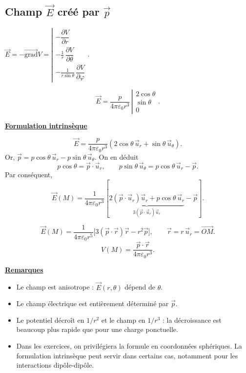 \documentclass[11pt,a4paper]{article}
\newif\ifinexample
\newcommand{\dd}{\mathrm d}
\newcommand{\grad}{\overrightarrow{\mathrm{grad}}}
\newcommand{\titr}[1]{\par\ifinexample\else\Needspace{4\baselineskip}\fi\textbf{\underline{#1}}\par\nopagebreak[3]}
\newcommand{\stars}[1]{\mathord{\star}\ifnum#1>1\mkern5mu\mathord{\star}\fi\ifnum#1>2\mkern5mu\mathord{\star}\fi\ifnum#1>3\mkern5mu\mathord{\star}\fi\ifnum#1>4\mkern5mu\mathord{\star}\fi\ifnum#1>5\mkern5mu\mathord{\star}\fi}
\newenvironment{result}[1][4]{\begin{cadre}[etoiles={\stars{#1}}]}{\end{cadre}}
\newcommand{\ur}{\vec u_r}\newcommand{\ut}{\vec u_\theta}\newcommand{\uphi}{\vec u_\varphi}
\newcommand{\eps}{\varepsilon_0}\newcommand{\E}{\vec E}\newcommand{\dS}{\dd\vec S}\newcommand{\dM}{\dd\vec M}
\newcommand{\mom}{\vec p}
\newcommand{\fle}[1]{\overrightarrow{#1}}
\newcommand{\trois}[3]{\left|\begin{matrix}#1\\#2\\#3\end{matrix}\right.}
\newcommand{\surdeux}[3]{\par\noindent
  \begin{minipage}[c]{#1\linewidth}\centering #2\end{minipage}\hfill
  \begin{minipage}[c]{\dimexpr\linewidth-#1\linewidth-5mm\relax}#3\end{minipage}\par}
\newcommand{\betoile}[2]{\begin{result}[#1]\[#2\]\end{result}}
\begin{document}
\subsection{Champ \texorpdfstring{\(\E\)}{E} créé par \texorpdfstring{\(\mom\)}{p}}\label{sec:champ}
\surdeux{.37}{\(\displaystyle
 \E=-\grad V=\left|\begin{matrix}
 -\dfrac{\partial V}{\partial r}\\[4pt]
 -\tfrac1r\,\dfrac{\partial V}{\partial\theta}\\[4pt]
 -\tfrac1{r\sin\theta}\,\dfrac{\partial V}{\partial\varphi}
 \end{matrix}\right..\)}{
\betoile{4}{\E=\frac{p}{4\pi\eps r^3}\,\trois{2\cos\theta}{\sin\theta}{0}.}}
\titr{Formulation intrinsèque}
\[
 \E=\frac{p}{4\pi\eps r^3}\left(2\cos\theta\,\ur+\sin\theta\,\ut\right).
\]
Or, \(\mom=p\cos\theta\,\ur-p\sin\theta\,\ut\). On en déduit
\[
 p\cos\theta=\mom\cdot\ur,\qquad
 p\sin\theta\,\ut=p\cos\theta\,\ur-\mom.
\]
Par conséquent,
\[
 \E(M)=\frac1{4\pi\eps r^3}\left[
 \underbrace{2(\mom\cdot\ur)\ur+p\cos\theta\,\ur}_{3(\mom\cdot\ur)\ur}
 -\mom\right].
\]
\begin{result}[3]
\[
 \E(M)=\frac{1}{4\pi\eps r^5}\big[3(\mom\cdot\vec r)\vec r-r^2\mom\big],
 \qquad \vec r=r\,\ur=\fle{OM}.
\]
\[V(M)=\frac{\mom\cdot\vec r}{4\pi\eps r^3}.\]
\end{result}
\titr{Remarques}
\begin{itemize}
\item Le champ est anisotrope : \(\E(r,\theta)\) dépend de \(\theta\).
\item Le champ électrique est entièrement déterminé par \(\mom\).
\item Le potentiel décroît en \(1/r^2\) et le champ en \(1/r^3\) : la décroissance est beaucoup plus rapide que pour une charge ponctuelle.
\item Dans les exercices, on privilégiera la formule en coordonnées sphériques. La formulation intrinsèque peut servir dans certains cas, notamment pour les interactions dipôle-dipôle.
\end{itemize}
\end{document}
